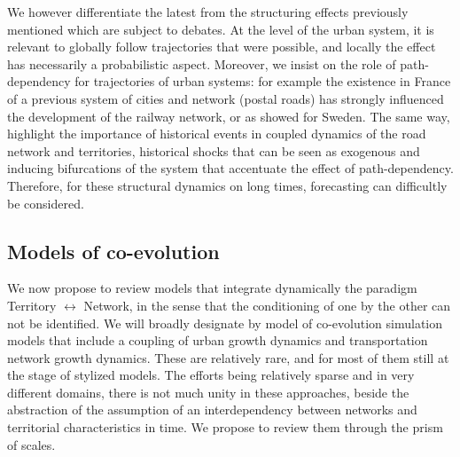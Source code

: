 We however differentiate the latest from the structuring effects previously mentioned which are subject to debates. At the level of the urban system, it is relevant to globally follow trajectories that were possible, and locally the effect has necessarily a probabilistic aspect. Moreover, we insist on the role of path-dependency for trajectories of urban systems: for example the existence in France of a previous system of cities and network (postal roads) has strongly influenced the development of the railway network, or as \cite{berger2017locomotives} showed for Sweden. The same way, \cite{doi:10.1068/b39089} highlight the importance of historical events in coupled dynamics of the road network and territories, historical shocks that can be seen as exogenous and inducing bifurcations of the system that accentuate the effect of path-dependency. Therefore, for these structural dynamics on long times, forecasting can difficultly be considered.


\subsection{Models of co-evolution}

We now propose to review models that integrate dynamically the paradigm Territory $\leftrightarrow$ Network, in the sense that the conditioning of one by the other can not be identified. We will broadly designate by model of co-evolution simulation models that include a coupling of urban growth dynamics and transportation network growth dynamics. These are relatively rare, and for most of them still at the stage of stylized models. The efforts being relatively sparse and in very different domains, there is not much unity in these approaches, beside the abstraction of the assumption of an interdependency between networks and territorial characteristics in time. We propose to review them through the prism of scales.




